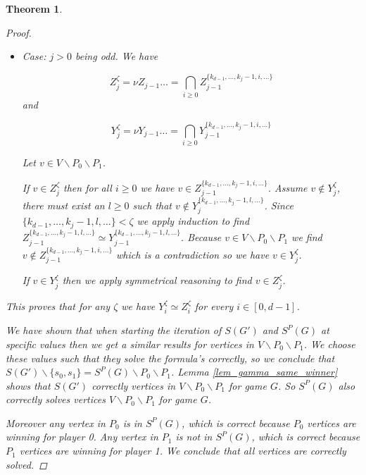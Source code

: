 \documentclass[]{article}
\newtheorem{theorem}{Theorem}[section]
\begin{document}
\begin{theorem}
\begin{proof}
\begin{itemize}
			\[ Y_j^{\zeta} = \mu Y_{j-1}\dots = \bigcup_{i\geq 0} Y_{j-1}^{\{k_{d-1},\dots,k_j-1,i,\dots\}}\]
			
			Let $v \in V \backslash P_0 \backslash P_1$.
			
			If $v \in Z_j^{\zeta}$ then there exists some $i$ such that $v \in Z_{j-1}^{\{k_{d-1},\dots,k_j-1,i,\dots\}}$. Since $\{k_{d-1},\dots,k_j-1,i,\dots\} < \zeta$ we apply induction to find $Z_{j-1}^{\{k_{d-1},\dots,k_j-1,i,\dots\}} \simeq Y_{j-1}^{\{k_{d-1},\dots,k_j-1,i,\dots\}}$. Because $v \in V \backslash P_0 \backslash P_1$ we find $v \in Y_{j-1}^{\{k_{d-1},\dots,k_j-1,i,\dots\}}$ and therefore $v \in Y_j^{\zeta}$.
			
			If $v \in Y_j^{\zeta}$ then we apply symmetrical reasoning to find $v \in Z_j^{\zeta}$.
			\item Case: $j > 0$ being odd. We have 
			
			\[ Z_j^{\zeta} = \nu Z_{j-1}\dots = \bigcap_{i\geq 0} Z_{j-1}^{\{k_{d-1},\dots,k_j-1,i,\dots\}}\]
			and 
			
			\[ Y_j^{\zeta} = \nu Y_{j-1}\dots = \bigcap_{i\geq 0} Y_{j-1}^{\{k_{d-1},\dots,k_j-1,i,\dots\}}\]
			
			Let $v \in V \backslash P_0 \backslash P_1$.
			
			If $v \in Z_j^{\zeta}$ then for all $i \geq 0$ we have $v \in Z_{j-1}^{\{k_{d-1},\dots,k_j-1,i,\dots\}}$. Assume $v \notin Y_j^{\zeta}$, there must exist an $l \geq 0$ such that $v \notin Y_j^{\{k_{d-1},\dots,k_j-1,l,\dots\}}$. Since $\{k_{d-1},\dots,k_j-1,l,\dots\} < \zeta$ we apply induction to find $Z_{j-1}^{\{k_{d-1},\dots,k_j-1,l,\dots\}} \simeq Y_{j-1}^{\{k_{d-1},\dots,k_j-1,l,\dots\}}$. Because $v \in V \backslash P_0 \backslash P_1$ we find $v \notin Z_{j-1}^{\{k_{d-1},\dots,k_j-1,i,\dots\}}$ which is a contradiction so we have $v \in Y_j^{\zeta}$.
			
			If $v \in Y_j^{\zeta}$ then we apply symmetrical reasoning to find $v \in Z_j^{\zeta}$.
			\end{itemize}
			
			This proves that for any $\zeta$ we have $Y_i^{\zeta} \simeq Z_i^{\zeta}$ for every $i \in [0,d-1]$.
			
			We have shown that when starting the iteration of $S(G')$ and $S^P(G)$ at specific values then we get a similar results for vertices in $V \backslash P_0 \backslash P_1$. We choose these values such that they solve the formula's correctly, so we conclude that $S(G') \backslash \{s_0,s_1\} = S^P(G) \backslash P_0 \backslash P_1$. Lemma \ref{lem_gamma_same_winner} shows that $S(G')$ correctly vertices in $V \backslash P_0 \backslash P_1$ for game $G$. So $S^P(G)$ also correctly solves vertices $V \backslash P_0 \backslash P_1$ for game $G$. 
			
			Moreover any vertex in $P_0$ is in $S^P(G)$, which is correct because $P_0$ vertices are winning for player 0. Any vertex in $P_1$ is not in $S^P(G)$, which is correct because $P_1$ vertices are winning for player 1. We conclude that all vertices are correctly solved.
		\end{proof}
	\end{theorem}
\end{document}
